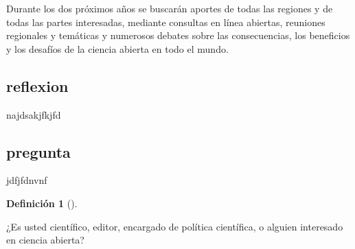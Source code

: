 \documentclass[
  letterpaper,
  DIV=11,
  numbers=noendperiod]{scrartcl}
\theoremstyle{definition}
\newtheorem{definition}{Definición}[section]
\theoremstyle{remark}
\begin{document}
\begin{tcolorbox}[enhanced jigsaw, left=2mm, title=\textcolor{quarto-callout-caution-color}{\faFire}\hspace{0.5em}{Precaución}, colbacktitle=quarto-callout-caution-color!10!white, opacitybacktitle=0.6, opacityback=0, colframe=quarto-callout-caution-color-frame, colback=white, rightrule=.15mm, toprule=.15mm, bottomrule=.15mm, bottomtitle=1mm, coltitle=black, breakable, toptitle=1mm, titlerule=0mm, arc=.35mm, leftrule=.75mm]

Durante los dos próximos años se buscarán aportes de todas las regiones
y de todas las partes interesadas, mediante consultas en línea abiertas,
reuniones regionales y temáticas y numerosos debates sobre las
consecuencias, los beneficios y los desafíos de la ciencia abierta en
todo el mundo.

\end{tcolorbox}

\subsection{reflexion}

najdsakjfkjfd

\subsection{pregunta}

jdfjfdnvnf

\begin{definition}[]\protect\hypertarget{def-definir}{}\label{def-definir}

¿Es usted científico, editor, encargado de política científica, o
alguien interesado en ciencia abierta?

\end{definition}
\end{document}
